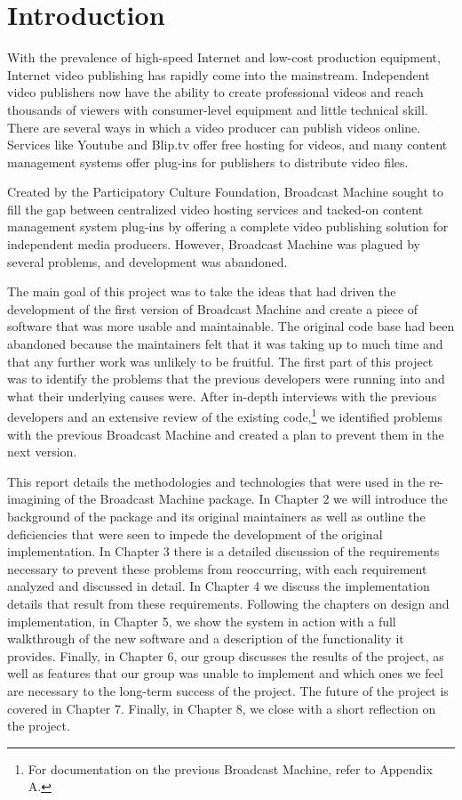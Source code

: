 \documentclass[a4paper,12pt]{report}
\begin{document}
\tableofcontents

\chapter{Introduction}
With the prevalence of high-speed Internet and low-cost production equipment, Internet video publishing has rapidly come into the 
mainstream. Independent video publishers now have the ability to create professional videos and reach thousands of viewers with consumer-level equipment and little technical skill. There are several ways in which a video producer can publish videos online. Services like Youtube and Blip.tv offer free hosting for videos, and many content management systems offer plug-ins for publishers to distribute video files.

Created by the Participatory Culture Foundation, Broadcast Machine sought to fill the gap between centralized video hosting services and tacked-on content management system plug-ins by offering a complete video publishing solution for independent media producers. However, Broadcast Machine was plagued by several problems, and development was abandoned.

The main goal of this project was to take the ideas that had driven the development of the first version of Broadcast Machine and create a piece of software that was more usable and maintainable.
The original code base had been abandoned because the maintainers felt that it was taking up to much time and that any further work was unlikely to be fruitful.
The first part of this project was to identify the problems that the previous developers were running into and what their underlying causes were.
After in-depth interviews with the previous developers and an extensive review of the existing code,\footnote{For documentation on the previous Broadcast Machine, refer to Appendix A.} we identified problems with the previous Broadcast Machine and created a plan to prevent them in the next version.

This report details the methodologies and technologies that were used in the re-imagining of the Broadcast Machine package.
In Chapter 2 we will introduce the background of the package and its original maintainers as well as outline the deficiencies that were seen to impede the development of the original implementation.
In Chapter 3 there is a detailed discussion of the requirements necessary to prevent these problems from reoccurring, with each requirement analyzed and discussed in detail.
In Chapter 4 we discuss the implementation details that result from these requirements.
Following the chapters on design and implementation, in Chapter 5, we show the system in action with a full walkthrough of the new software and a description of the functionality it provides.
Finally, in Chapter 6, our group discusses the results of the project, as well as features that our group was unable to implement and which ones we feel are necessary to the long-term success of the project. The future of the project is covered in Chapter 7. Finally, in Chapter 8, we close with a short reflection on the project.
\end{document}
